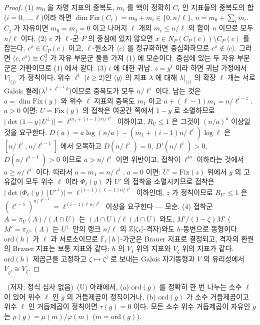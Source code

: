 \begin{proof}
(1) $m_0$ 을 자명 지표의 중복도, $m_i$ 를 핵이 정확히 $C_i$ 인 지표들의 중복도의 합($i=0,\dots,\ell$)이라 하면 $\dim\mathrm{Fix}(C_i)=m_0+m_i\in\{0,n/\ell\}$, $n=m_0+\sum_im_i$. $C_j$ 가 자유이면 $m_0=m_j=0$ 이고 나머지 $\ell$ 개의 $m_i\le n/\ell$ 의 합이 $n$ 이므로 모두 $n/\ell$ 이다.
(2) $c$ 가 $\ell$-군 $P$ 의 중심에 있지 않으면 $x\in N_P(C_P(c))\setminus C_P(c)$ 를 잡는다. $c^x\in C_P(c)$ 이고, $\ell$-원소가 $\langle c\rangle$ 를 정규화하면 중심화하므로 $c^x\notin\langle c\rangle$. 그러면 $\langle c,c^x\rangle\cong C_\ell^2$ 가 자유 부분군 둘을 가져 (1) 에 모순이다. 중심에 있는 두 자유 부분군은 가환이므로 (1) 에서 같다.
(3) $i$ 에 대한 귀납. $z=y^\ell$ 이라 하면 귀납 가정에서 $V|_{\langle z\rangle}$ 가 정칙이다. 위수 $\ell^t$ ($t\ge2$)인 $\langle y\rangle$ 의 지표 $\lambda$ 에 대해 $\lambda|_{\langle z\rangle}$ 의 확장 $\ell$ 개는 서로 Galois 켤레($\lambda^{1+\ell^{t-1}k}$)이므로 중복도가 모두 $n/\ell^i$ 이다. 남는 것은 $a=\dim\mathrm{Fix}(y)$ 와 위수 $\ell$ 지표의 중복도 $m_1$ 이고 $a+(\ell-1)m_1=n/\ell^{i-1}$. $a>0$ 이면: $U=\mathrm{Fix}(y)$ 의 접착은 여공간 쪽에서 $1-y$ 로 소멸하므로 $|\det(1-y\,|\,U^\perp)|=\ell^{m_1+(i-1)n/\ell^i}$ 이하이고, $R_U\le1$ 은 그것이 $(n/a)^a$ 이상일 것을 요구한다. $D(a)=a\log(n/a)-(m_1+(i-1)n/\ell^i)\log\ell$ 은 $[n/\ell^i,n/\ell^{i-1}]$ 에서 오목하고 $D(n/\ell^i)=0$, $D'(n/\ell^i)>0$, $D(n/\ell^{i-1})>0$ 이므로 $a>n/\ell^i$ 이면 위반이고, 접착이 $\ell^{ia}$ 이하라는 것에서 $a\ge n/\ell^i$ 이다. 따라서 $a=m_1=n/\ell^i$. $a=0$ 이면: $U'=\mathrm{Fix}(z)$ 위에서 $y$ 의 고유값이 모두 위수 $\ell$ 이라 $\Phi_\ell(y)$ 가 $U'$ 의 접착을 소멸시키므로 접착은 $|\det(\Phi_\ell(y)\,|\,U'^\perp)|=\ell^{(i-1)(\ell-1)n/\ell^i}$ 이하인데, $z$ 가 정칙이므로 $R_{U'}\le1$ 은 $(\ell^{i-1})^{n/\ell^{i-1}}=\ell^{(i-1)\ell n/\ell^i}$ 이상을 요구한다 --- 모순.
(4) 접착군 $A=\pi_U(\Lambda)/(\Lambda\cap U)$ 는 $(\Lambda\cap U)/\ell(\Lambda\cap U)$ 와도, $M'/(1-\zeta)M'$ ($M'=\pi_{U^\perp}(\Lambda)$ 는 $U^\perp$ 안의 랭크 $n/\ell$ 의 $\mathbb{Z}[\zeta_\ell]$-격자)와도 $h$-동변으로 동형이다. $\mathrm{ord}(h)$ 가 $\ell$ 과 서로소이므로 $\mathbb F_\ell[h]$-가군은 Brauer 지표로 결정되고, 격자의 환원의 Brauer 지표는 보통 지표와 같다: $h$ 의 $V_1$ 위의 지표와 $V_\zeta$ 위의 지표가 같다. $\mathrm{ord}(h)$ 제곱근을 고정하고 $\zeta\mapsto\zeta^j$ 로 보내는 Galois 자기동형과 $V$ 의 유리성에서 $V_{\zeta^j}\cong V_\zeta$.
\end{proof}
\begin{corollary}\label{cor:tracezero}\tagP\ (저자; 정식 심사 없음)\
(U) 아래에서, (a) $\mathrm{ord}(g)$ 를 정확히 한 번 나누는 소수 $\ell$ 이 있어 위수 $\ell$ 인 $g$ 의 거듭제곱이 정칙이거나, (b) $\mathrm{ord}(g)$ 가 소수 거듭제곱이고 위수 $\ell$ 인 거듭제곱이 정칙이면 $\tau(g)=0$ 이다. 모든 소수 위수 거듭제곱이 자유인 $g$ 는 $\rho(g)=\mu(m)/\varphi(m)$ ($m=\mathrm{ord}(g)$).
\end{corollary}
